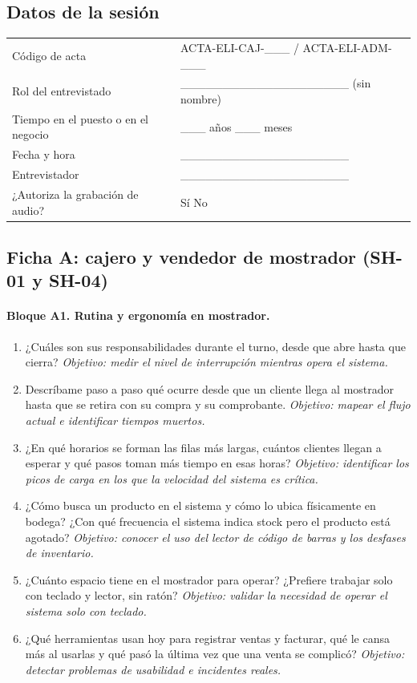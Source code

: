 \subsection*{Datos de la sesión}
\begin{tabularx}{\textwidth}{@{}L{5cm}X@{}}
\toprule
Código de acta & ACTA-ELI-CAJ-\_\_\_ / ACTA-ELI-ADM-\_\_\_ \\
Rol del entrevistado & \_\_\_\_\_\_\_\_\_\_\_\_\_\_\_\_\_\_\_\_ (sin nombre) \\
Tiempo en el puesto o en el negocio & \_\_\_ años \_\_\_ meses \\
Fecha y hora & \_\_\_\_\_\_\_\_\_\_\_\_\_\_\_\_\_\_\_\_ \\
Entrevistador & \_\_\_\_\_\_\_\_\_\_\_\_\_\_\_\_\_\_\_\_ \\
¿Autoriza la grabación de audio? & Sí \quad No \\
\bottomrule
\end{tabularx}

\subsection*{Ficha A: cajero y vendedor de mostrador (SH-01 y SH-04)}

\paragraph{Bloque A1. Rutina y ergonomía en mostrador.}
\begin{enumerate}[label=A1.\arabic*, leftmargin=*]
\item ¿Cuáles son sus responsabilidades durante el turno, desde que abre hasta que cierra? \emph{Objetivo: medir el nivel de interrupción mientras opera el sistema.}
\item Descríbame paso a paso qué ocurre desde que un cliente llega al mostrador hasta que se retira con su compra y su comprobante. \emph{Objetivo: mapear el flujo actual e identificar tiempos muertos.}
\item ¿En qué horarios se forman las filas más largas, cuántos clientes llegan a esperar y qué pasos toman más tiempo en esas horas? \emph{Objetivo: identificar los picos de carga en los que la velocidad del sistema es crítica.}
\item ¿Cómo busca un producto en el sistema y cómo lo ubica físicamente en bodega? ¿Con qué frecuencia el sistema indica stock pero el producto está agotado? \emph{Objetivo: conocer el uso del lector de código de barras y los desfases de inventario.}
\item ¿Cuánto espacio tiene en el mostrador para operar? ¿Prefiere trabajar solo con teclado y lector, sin ratón? \emph{Objetivo: validar la necesidad de operar el sistema solo con teclado.}
\item ¿Qué herramientas usan hoy para registrar ventas y facturar, qué le cansa más al usarlas y qué pasó la última vez que una venta se complicó? \emph{Objetivo: detectar problemas de usabilidad e incidentes reales.}
\end{enumerate}

